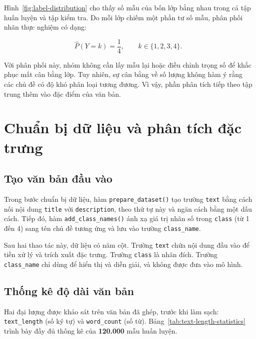 \documentclass[12pt]{hcmut-report}
\newcommand{\firstparagraph}{\noindent\hspace*{2em}}
\begin{document}
Hình~\ref{fig:label-distribution} cho thấy số mẫu của bốn lớp bằng nhau trong cả tập huấn luyện và tập kiểm tra. Do mỗi lớp chiếm một phần tư số mẫu, phân phối nhãn thực nghiệm có dạng:

\begin{equation}
  \widehat{P}(Y=k)=\frac{1}{4},\qquad k\in\{1,2,3,4\}.
  \label{eq:uniform-label}
\end{equation}

Với phân phối này, nhóm không cần lấy mẫu lại hoặc điều chỉnh trọng số để khắc phục mất cân bằng lớp. Tuy nhiên, sự cân bằng về số lượng không hàm ý rằng các chủ đề có độ khó phân loại tương đương. Vì vậy, phần phân tích tiếp theo tập trung thêm vào đặc điểm của văn bản.

\section{Chuẩn bị dữ liệu và phân tích đặc trưng}

\subsection{Tạo văn bản đầu vào}

\firstparagraph Trong bước chuẩn bị dữ liệu, hàm \texttt{prepare\_dataset()} tạo trường \texttt{text} bằng cách nối nội dung \texttt{title} với \texttt{description}, theo thứ tự này và ngăn cách bằng một dấu cách. Tiếp đó, hàm \texttt{add\_class\_names()} ánh xạ giá trị nhãn số trong \texttt{class} (từ 1 đến 4) sang tên chủ đề tương ứng và lưu vào trường \texttt{class\_name}.

Sau hai thao tác này, dữ liệu có năm cột. Trường \texttt{text} chứa nội dung đầu vào để tiền xử lý và trích xuất đặc trưng. Trường \texttt{class} là nhãn đích. Trường \texttt{class\_name} chỉ dùng để hiển thị và diễn giải, và không được đưa vào mô hình.

\subsection{Thống kê độ dài văn bản}

\firstparagraph Hai đại lượng được khảo sát trên văn bản đã ghép, trước khi làm sạch: \texttt{text\_length} (số ký tự) và \texttt{word\_count} (số từ). Bảng~\ref{tab:text-length-statistics} trình bày đầy đủ thống kê của \textbf{120.000} mẫu huấn luyện.
\end{document}
